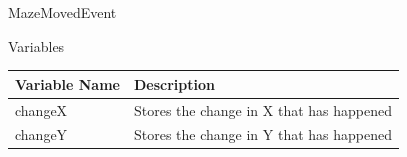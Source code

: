 \documentclass{article}
\begin{document}
                MazeMovedEvent
                \begin{center}
                    Variables
                    \begin{tabular}{ | m{} | m{} | }
                        \hline
                        \textbf{Variable Name} & \textbf{Description} \\
                        \hline
                        changeX & Stores the change in X that has happened \\
                        \hline
                        changeY & Stores the change in Y that has happened \\
                        \hline
                    \end{tabular}
                \end{center}
            \clearpage
\end{document}
